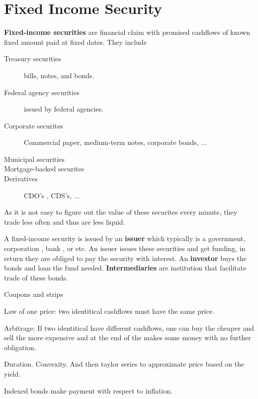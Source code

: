 \chapter{Fixed Income Security}
\textbf{Fixed-income securities} are financial claim with promised cashflows of known fixed amount paid at fixed dates. They include
\begin{description}
    \item[Treasury securities] bills, notes, and bonds.
    \item[Federal agency securities] issued by federal agencies. 
    \item[Corporate securites] Commercial paper, medium-term notes, corporate bonds, \(\dots\) 
    \item[Municipal securities]
    \item[Mortgage-backed securites]
    \item[Derivatives] CDO's , CDS's, \(\dots\)   
\end{description}

As it is not easy to figure out the value of these securites every minute, they trade less often and thus are less liquid.

A fixed-income security is issued by an \textbf{issuer} which typically is a government, corporation , bank , or etc. An issuer issues these securities and get funding, in return they are obliged to pay the security with interest. An \textbf{investor} buys the bonds and loan the fund needed. \textbf{Intermediaries} are institution that facilitate trade of these bonds. 



Coupons and strips

Law of one price: two identitical cashflows must have the same price.

Arbitrage: If two identitical have different cashflows, one can buy the cheaper and sell the more expensive and at the end of the makes some money with no further obligation. 

Duration.
Convexity. And then taylor series to approximate price based on the yield.

Indexed bonds make payment with respect to inflation.